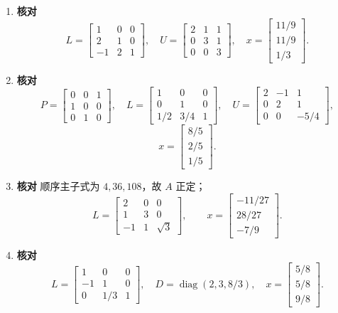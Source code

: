 \documentclass{article}
\newcommand{\diag}{\operatorname{diag}}
\newcommand{\answertag}{\textcolor{green!45!black}{\textbf{核对}}}
\begin{document}
\begin{enumerate}
  \item \answertag{}
  \[
    L=\begin{bmatrix}1&0&0\\2&1&0\\-1&2&1\end{bmatrix},\quad
    U=\begin{bmatrix}2&1&1\\0&3&1\\0&0&3\end{bmatrix},\quad
    x=\begin{bmatrix}11/9\\11/9\\1/3\end{bmatrix}.
  \]

  \item \answertag{}
  \[
    P=\begin{bmatrix}0&0&1\\1&0&0\\0&1&0\end{bmatrix},\quad
    L=\begin{bmatrix}1&0&0\\0&1&0\\1/2&3/4&1\end{bmatrix},\quad
    U=\begin{bmatrix}2&-1&1\\0&2&1\\0&0&-5/4\end{bmatrix},
  \]
  \[
    x=\begin{bmatrix}8/5\\2/5\\1/5\end{bmatrix}.
  \]

  \item \answertag{} 顺序主子式为 $4,36,108$，故 $A$ 正定；
  \[
    L=\begin{bmatrix}2&0&0\\1&3&0\\-1&1&\sqrt3\end{bmatrix},\qquad
    x=\begin{bmatrix}-11/27\\28/27\\-7/9\end{bmatrix}.
  \]

  \item \answertag{}
  \[
    L=\begin{bmatrix}1&0&0\\-1&1&0\\0&1/3&1\end{bmatrix},\quad
    D=\diag(2,3,8/3),\quad
    x=\begin{bmatrix}5/8\\5/8\\9/8\end{bmatrix}.
  \]


\end{enumerate}
\end{document}
